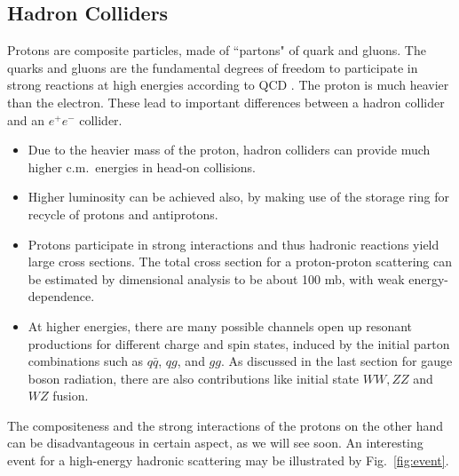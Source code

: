 \documentclass[12pt,prd,aps,floats,preprintnumbers,preprint,superscriptaddress,floatfix,nofootinbib]{revtex4}
\def\epem{e^+e^-}
\def\be{\begin{equation}}
\def\ee{\end{equation}}
\begin{document}
\subsection{Hadron Colliders}
Protons are composite particles, made of  ``partons" of quark and gluons. 
The quarks and gluons are the fundamental degrees of freedom to
participate in strong reactions at high energies according to QCD \cite{george}.
%
The proton is much heavier than the electron. 
These lead to important differences  between  a hadron collider and 
an $\epem$ collider.
%
\begin{itemize}
\item Due to the heavier mass of the proton,   hadron colliders can provide 
much higher c.m.~energies in head-on collisions. 
\item Higher luminosity can be achieved also, by making use of the
storage ring for recycle of protons and antiprotons. 
\item Protons participate in strong interactions and thus hadronic
reactions yield large cross sections. The total cross section for a proton-proton
 scattering can be estimated by dimensional analysis to be about 100 mb,
 with weak energy-dependence.
\item
At higher energies, there are many possible channels open up 
resonant productions for
 different charge and spin states,  induced by the initial parton 
 combinations  such as  $q\bar q$, $qg$, and $gg$.
As discussed in the last section for gauge boson radiation, there are also
contributions like initial state $WW, ZZ$ and $WZ$ fusion.
\end{itemize}
%

The compositeness and the strong interactions of the protons 
on the other hand can  be disadvantageous  in certain aspect,
as we will see soon. An interesting event for a high-energy hadronic  
scattering may be illustrated by Fig.~\ref{fig:event}.
\end{document}

